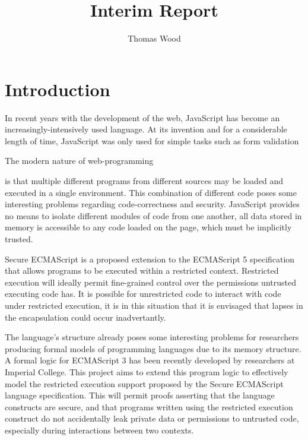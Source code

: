 \documentclass[a4paper]{report}
\title{Interim Report}
\author{Thomas Wood}
\begin{document}
\maketitle

\begin{abstract}
\end{abstract}

\chapter{Introduction}
  In recent years with the development of the web, JavaScript has become an
  increasingly-intensively used language. At its invention and for a
  considerable length of time, JavaScript was only used for simple tasks such as
  form validation
  
  The modern nature of web-programming

  is that multiple different programs from different sources may be loaded and
  executed in a single environment. This combination of different code poses some
  interesting problems regarding code-correctness and security. JavaScript
  provides no means to isolate different modules of code from one another, all
  data stored in memory is accessible to any code loaded on the page, which must
  be implicitly trusted.

  Secure ECMAScript is a proposed extension to the ECMAScript 5 specification
  that allows programs to be executed within a restricted context. Restricted
  execution will ideally permit fine-grained control over the permissions
  untrusted executing code has. It is possible for unrestricted code to interact
  with code under restricted execution, it is in this situation that it is
  envisaged that lapses in the encapsulation could occur inadvertantly.

  The language's structure already poses some interesting problems for researchers
  producing formal models of programming languages due to its memory structure.
  A formal logic for ECMAScript 3 has been recently developed by researchers at
  Imperial College. This project aims to extend this program logic to
  effectively model the restricted execution support proposed by the Secure
  ECMAScript language specification. This will permit proofs asserting that the
  language constructs are secure, and that programs written using the restricted
  execution construct do not accidentally leak private data or permissions to
  untrusted code, especially during interactions between two contexts.
\end{document}
